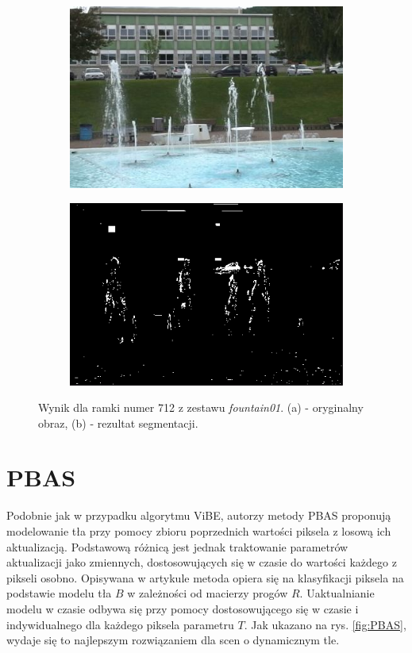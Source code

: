 \begin{figure}[!h]
\centering
\begin{subfigure}[b]{0.4\textwidth}
\includegraphics[width=\textwidth]{img/GMMIn}
\caption{}
\end{subfigure}
\quad
\begin{subfigure}[b]{0.4\textwidth}
\includegraphics[width=\textwidth]{img/ViBEOut}
\caption{}
\end{subfigure}
\caption{Wynik dla ramki numer 712 z zestawu \textit{fountain01}. (a) - oryginalny obraz, (b) - rezultat segmentacji.\label{fig:ViBE}}
\end{figure}


\section{PBAS}
Podobnie jak w przypadku algorytmu ViBE, autorzy metody PBAS proponują modelowanie tła przy pomocy zbioru poprzednich wartości piksela z losową ich aktualizacją. Podstawową różnicą jest jednak traktowanie parametrów aktualizacji jako zmiennych, dostosowujących się w czasie do wartości każdego z pikseli osobno. Opisywana w artykule \citep{hofmann2012background} metoda opiera się na klasyfikacji piksela na podstawie modelu tła $B$ w zależności od macierzy progów $R$. Uaktualnianie modelu w czasie odbywa się przy pomocy dostosowującego się w czasie i indywidualnego dla każdego piksela parametru $T$. Jak ukazano na rys. \ref{fig:PBAS}, wydaje się to najlepszym rozwiązaniem dla scen o dynamicznym tle.
